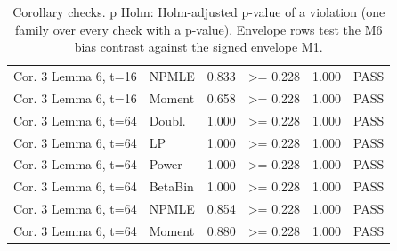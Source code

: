 \begin{table}[t]
\begin{tabular}{p{1.25in}lp{0.9in}p{0.85in}rl}
Cor. 3 Lemma 6, t=16 & NPMLE & 0.833 & >= 0.228 & 1.000 & PASS \\
Cor. 3 Lemma 6, t=16 & Moment & 0.658 & >= 0.228 & 1.000 & PASS \\
Cor. 3 Lemma 6, t=64 & Doubl. & 1.000 & >= 0.228 & 1.000 & PASS \\
Cor. 3 Lemma 6, t=64 & LP & 1.000 & >= 0.228 & 1.000 & PASS \\
Cor. 3 Lemma 6, t=64 & Power & 1.000 & >= 0.228 & 1.000 & PASS \\
Cor. 3 Lemma 6, t=64 & BetaBin & 1.000 & >= 0.228 & 1.000 & PASS \\
Cor. 3 Lemma 6, t=64 & NPMLE & 0.854 & >= 0.228 & 1.000 & PASS \\
Cor. 3 Lemma 6, t=64 & Moment & 0.880 & >= 0.228 & 1.000 & PASS \\
\bottomrule
\end{tabular}
\caption{Corollary checks. p Holm: Holm-adjusted p-value of a violation (one family over every check with a p-value). Envelope rows test the M6 bias contrast against the signed envelope M1.}
\label{tab:T2_corollary_checks}
\end{table}
